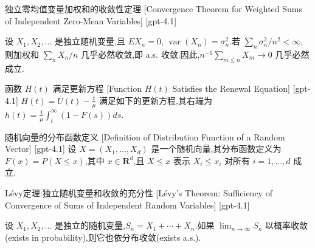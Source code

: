 \documentclass[UTF8]{ctexart}
\begin{document}
    
    
    \begin{thm}
        {独立零均值变量加权和的收敛性定理}
        [Convergence Theorem for Weighted Sums of Independent Zero-Mean Variables]
        [gpt-4.1]
        
设 $X_1, X_2, \dots$ 是独立随机变量,且 $E X_n = 0$, $\operatorname{var}(X_n) = \sigma_n^2$.若 $\sum_n \sigma_n^2 / n^2 < \infty$,则加权和 $\sum_n X_n / n$ 几乎必然收敛,即 a.s. 收敛.因此,$n^{-1} \sum_{m \leq n} X_m \to 0$ 几乎必然成立.

    \end{thm}
    
    
    
    \begin{ppt}
        {函数 $H(t)$ 满足更新方程}
        [Function $H(t)$ Satisfies the Renewal Equation]
        [gpt-4.1]
        $H ( t ) = U ( t ) - \frac{t}{\mu}$ 满足如下的更新方程,其右端为 $h ( t ) = \frac { 1 } { \mu } \int _ { t } ^ { \infty } ( 1 - F ( s ) ) d s$.
    \end{ppt}
    
    
    
    \begin{dfn}
        {随机向量的分布函数定义}
        [Definition of Distribution Function of a Random Vector]
        [gpt-4.1]
        设 $X = ( X_1, \ldots, X_d )$ 是一个随机向量,其分布函数定义为 $F(x) = P( X \leq x )$,其中 $x \in \mathbf{R}^d$,且 $X \leq x$ 表示 $X_i \leq x_i$ 对所有 $i = 1, \ldots, d$ 成立.
    \end{dfn}
    
    
    
    \begin{thm}
        {Lévy定理:独立随机变量和收敛的充分性}
        [Lévy's Theorem: Sufficiency of Convergence of Sums of Independent Random Variables]
        [gpt-4.1]
        
设 $X_1, X_2, \dots$ 是独立的随机变量,$S_n = X_1 + \cdots + X_n$.如果 $\operatorname{lim}_{n \to \infty} S_n$ 以概率收敛(exists in probability),则它也依分布收敛(exists a.s.).

    \end{thm}
    
    
    
\end{document}
